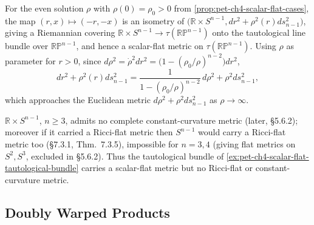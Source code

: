 \begin{example}
  \label{ex:pet-ch4-scalar-flat-tautological-bundle}
  For the even solution $\rho$ with $\rho(0)=\rho_0>0$ from
  \cref{prop:pet-ch4-scalar-flat-cases}, the map $(r,x)\mapsto(-r,-x)$ is an
  isometry of $\big(\mathbb{R}\times S^{n-1},dr^2+\rho^2(r)ds_{n-1}^2\big)$, giving a
  Riemannian covering $\mathbb{R}\times S^{n-1}\to\tau(\mathbb{RP}^{n-1})$ onto the
  tautological line bundle over $\mathbb{RP}^{n-1}$, and hence a scalar-flat metric on
  $\tau(\mathbb{RP}^{n-1})$. Using $\rho$ as parameter for $r>0$, since
  $d\rho^2=\dot\rho^2dr^2=\big(1-(\rho_0/\rho)^{n-2}\big)dr^2$,
  \[
    dr^2+\rho^2(r)ds_{n-1}^2=\frac1{1-(\rho_0/\rho)^{n-2}}\,d\rho^2+\rho^2ds_{n-1}^2,
  \]
  which approaches the Euclidean metric $d\rho^2+\rho^2ds_{n-1}^2$ as
  $\rho\to\infty$.
\end{example}

\begin{remark}
  \label{rem:pet-ch4-scalar-flat-not-ricci-flat}
  $\mathbb{R}\times S^{n-1}$, $n\ge3$, admits no complete constant-curvature metric
  (later, §5.6.2); moreover if it carried a Ricci-flat metric then $S^{n-1}$
  would carry a Ricci-flat metric too (§7.3.1, Thm.\ 7.3.5), impossible for
  $n=3,4$ (giving flat metrics on $S^2,S^3$, excluded in §5.6.2). Thus the
  tautological bundle of \cref{ex:pet-ch4-scalar-flat-tautological-bundle}
  carries a scalar-flat metric but no Ricci-flat or constant-curvature metric.
\end{remark}

\subsection{Doubly Warped Products}

